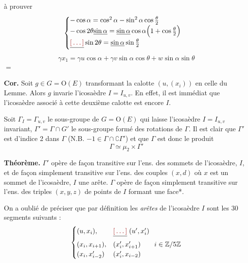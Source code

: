 \documentclass[11pt,a4paper]{article}
\begin{document}
à prouver
\[
\begin{cases}
  -\cos\alpha = \cos^2\alpha - \sin^2\alpha\cos\frac{\theta}{2} \\
  -\cos 2\theta \struck{\sin\alpha} = \struck{\sin\alpha}\cos\alpha\Bigl(1 + \cos\frac{\theta}{2}\Bigr) \\
  \struck{\ill{}} \sin 2\theta = \struck{\sin\alpha} \sin\frac{\theta}{2}
\end{cases}
\]
\[
  \gamma x_1 = \gamma u \cos\alpha + \gamma v \sin\alpha\cos\theta + w\sin\alpha\sin\theta
\]
$=$

\textbf{Cor.} Soit \struck{\ill{}} $g \in G = \mathrm{O}(E)$ transformant la calotte $(u, (x_i))$ en celle du Lemme. Alors $g$ invarie l'icosaèdre $I = I_{u,v}$.
En effet, il est immédiat que l'icosaèdre associé à cette deuxième calotte est encore $I$.

Soit $\Gamma_I = \Gamma_{u,v}$ le sous-groupe de $G = \mathrm{O}(E)$ qui laisse l'icosaèdre $I = I_{u,v}$ invariant, $\Gamma' = \Gamma \cap G'$ le sous-groupe formé des rotations de $\Gamma$. Il est clair que $\Gamma'$ est d'indice 2 dans $\Gamma$ (N.B. $-1 \in \Gamma \cap \complement\Gamma'$) et que $\Gamma$ est donc le produit
\[
  \Gamma \simeq \mu_2 \times \Gamma'
\]

\textbf{Théorème.} $\Gamma'$ opère de façon transitive sur l'ens. des sommets de l'icosaèdre, $I$, et de façon simplement transitive sur l'ens. des couples $(x, d)$ où $x$ est un sommet de l'icosaèdre, $I$ une arête. $\Gamma$ opère de façon simplement transitive sur l'ens. des triples $(x,y,z)$ de points de $I$ formant une face*.

On a oublié de préciser que par définition les \emph{arêtes} de l'icosaèdre $I$ sont les 30 segments suivants  :
\[
\begin{cases}
  (u, x_i), & \struck{\ill{}} \; (u', x'_i) \\
  (x_i, x_{i+1}), & (x'_i, x'_{i+1}) \qquad i \in \mathbb{Z}/5\mathbb{Z} \\
  (x_i, x'_{i-2}) & (x'_i, x_{i-2})
\end{cases}
\]
\end{document}
